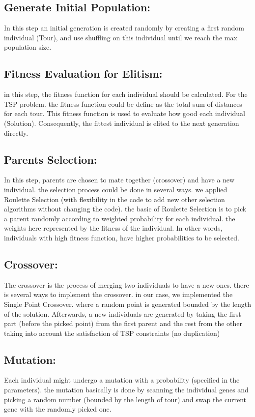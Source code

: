 \documentclass[11pt, english]{article}
\begin{document}
\subsection{Generate Initial Population:}
In this step an initial generation is created randomly by creating a first random individual (Tour), and use shuffling on this individual until we reach the max population size. 
\subsection{Fitness Evaluation for Elitism:}
in this step, the fitness function for each individual should be calculated. For the TSP problem. the fitness function could be define as the total sum of distances for each tour.
This fitness function is used to evaluate how good each individual (Solution). Consequently, the fittest individual is elited to the next generation directly.
\subsection{Parents Selection:}
In this step, parents are chosen to mate together (crossover) and have a new individual. the selection process could be done in several ways. we applied Roulette Selection (with flexibility in the code to add new other selection algorithms without changing the code).
the basic of Roulette Selection is to pick a parent randomly according to weighted probability for each individual. the weights here represented by the fitness of the individual. In other words, individuals with high fitness function, have higher probabilities to be selected.
\subsection{Crossover:}
The crossover is the process of merging two individuals to have a new ones. there is several ways to implement the crossover. in our case, we implemented the Single Point Crossover. where a random point is generated bounded by the length of the solution. Afterwards, a new individuals are generated by taking the first part (before the picked point) from the first parent and the rest from the other taking into account the satisfaction of TSP constraints (no duplication) 
\subsection{Mutation:}
Each individual might undergo a mutation with a probability (specified in the parameters). the mutation basically is done by scanning the individual genes and picking a random number (bounded by the length of tour) and swap the current gene with the randomly picked one.
\end{document}
